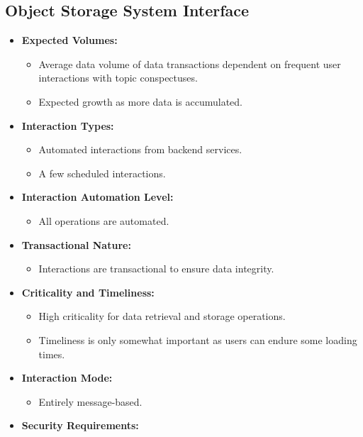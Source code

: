 \subsection*{Object Storage System Interface}
\begin{itemize}
    \item \textbf{Expected Volumes:}
          \begin{itemize}
              \item Average data volume of data transactions dependent on frequent user interactions with topic conspectuses.
              \item Expected growth as more data is accumulated.
          \end{itemize}
    \item \textbf{Interaction Types:}
          \begin{itemize}
              \item Automated interactions from backend services.
              \item A few scheduled interactions.
          \end{itemize}
    \item \textbf{Interaction Automation Level:}
          \begin{itemize}
              \item All operations are automated.
          \end{itemize}
    \item \textbf{Transactional Nature:}
          \begin{itemize}
              \item Interactions are transactional to ensure data integrity.
          \end{itemize}
    \item \textbf{Criticality and Timeliness:}
          \begin{itemize}
              \item High criticality for data retrieval and storage operations.
              \item Timeliness is only somewhat important as users can endure some loading times.
          \end{itemize}
    \item \textbf{Interaction Mode:}
          \begin{itemize}
              \item Entirely message-based.
          \end{itemize}
    \item \textbf{Security Requirements:}

\end{itemize}
